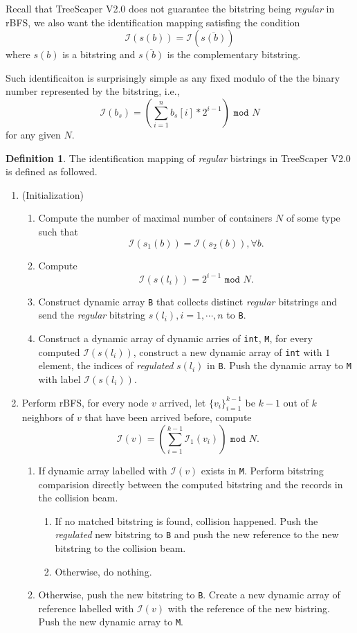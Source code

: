 \documentclass[11pt]{article}
\theoremstyle{definition}
\newtheorem{defn}{Definition}[section]
\theoremstyle{remark}
\theoremstyle{plain}
\begin{document}
Recall that TreeScaper V2.0 does not guarantee the bitstring being \emph{regular} in rBFS, we also want the identification mapping satisfing the condition
\[
	\mathcal{I}(s(b)) = \mathcal{I}(\overline{s(b)})
\]
where $s(b)$ is a bitstring and $\overline{s(b)}$ is the complementary bitstring.

Such identificaiton is surprisingly simple as any fixed modulo of the the binary number represented by the bitstring, i.e.,
\[
	\mathcal{I}(b_s) = \left(\sum_{i=1}^n b_s[i]*2^{i-1}\right) \texttt{ mod } N
\]
for any given $N$.

\begin{defn}
	The identification mapping of \emph{regular} bistrings in TreeScaper V2.0 is defined as followed. 
	\begin{enumerate}
		\item (Initialization) 
		\begin{enumerate}
			\item Compute the number of maximal number of containers $N$ of some type such that 
			\[
				\mathcal{I}(s_1(b)) = \mathcal{I}(s_2(b)), \forall b.
			\]
			\item Compute
			\[
				\mathcal{I}(s(l_i)) = 2^{i-1} \texttt{ mod } N.
			\]
			\item Construct dynamic array \texttt{B} that collects distinct \emph{regular} bitstrings and send the \emph{regular} bitstring $s(l_i), i = 1,\cdots,n$ to \texttt{B}.
			\item Construct a dynamic array of dynamic arries of \texttt{int}, \texttt{M}, for every computed $\mathcal{I}(s(l_i))$, construct a new dynamic array of \texttt{int} with $1$ element, the indices of \emph{regulated} $s(l_i)$ in \texttt{B}. Push the dynamic array to \texttt{M} with label $\mathcal{I}(s(l_i))$.
		\end{enumerate}
		\item Perform rBFS, for every node $v$ arrived, let $\{v_i\}_{i=1}^{k-1}$ be $k-1$ out of $k$ neighbors of $v$ that have been arrived before, compute
		\[
			\mathcal{I}(v) = \left(\sum_{i=1}^{k-1} \mathcal{I}_1(v_i)\right) \texttt{ mod } N.
		\]
		\begin{enumerate}
			\item If dynamic array labelled with $\mathcal{I}(v)$ exists in \texttt{M}. Perform bitstring comparision directly between the computed bitstring and the records in the collision beam. 
			\begin{enumerate}
				\item If no matched bitstring is found, collision happened. Push the \emph{regulated} new bitstring to \texttt{B} and push the new reference to the new bitstring to the collision beam.
				\item Otherwise, do nothing.
			\end{enumerate}
			\item Otherwise, push the new bitstring to \texttt{B}. Create a new dynamic array of reference labelled with $\mathcal{I}(v)$ with the reference of the new bistring. Push the new dynamic array to \texttt{M}.
		\end{enumerate}
	\end{enumerate}


\end{defn}
\end{document}
